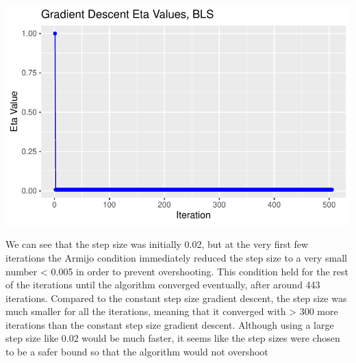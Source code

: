 \documentclass[
  letterpaper,
  DIV=11,
  numbers=noendperiod]{scrartcl}
\newenvironment{Shaded}{\begin{snugshade}}{\end{snugshade}}
\newcommand{\AttributeTok}[1]{\textcolor[rgb]{0.40,0.45,0.13}{#1}}
\newcommand{\DecValTok}[1]{\textcolor[rgb]{0.68,0.00,0.00}{#1}}
\newcommand{\FunctionTok}[1]{\textcolor[rgb]{0.28,0.35,0.67}{#1}}
\newcommand{\NormalTok}[1]{\textcolor[rgb]{0.00,0.23,0.31}{#1}}
\newcommand{\OtherTok}[1]{\textcolor[rgb]{0.00,0.23,0.31}{#1}}
\newcommand{\SpecialCharTok}[1]{\textcolor[rgb]{0.37,0.37,0.37}{#1}}
\newcommand{\StringTok}[1]{\textcolor[rgb]{0.13,0.47,0.30}{#1}}
\begin{document}
\begin{Shaded}
\end{Shaded}

\includegraphics{506021334_Stats102B_hw_1_files/figure-pdf/unnamed-chunk-2-1.pdf}

We can see that the step size was initially 0.02, but at the very first
few iterations the Armijo condition immediately reduced the step size to
a very small number \textless{} 0.005 in order to prevent overshooting.
This condition held for the rest of the iterations until the algorithm
converged eventually, after around 443 iterations. Compared to the
constant step size gradient descent, the step size was much smaller for
all the iterations, meaning that it converged with \textgreater{} 300
more iterations than the constant step size gradient descent. Although
using a large step size like 0.02 would be much faster, it seems like
the step sizes were chosen to be a safer bound so that the algorithm
would not overshoot
\end{document}

